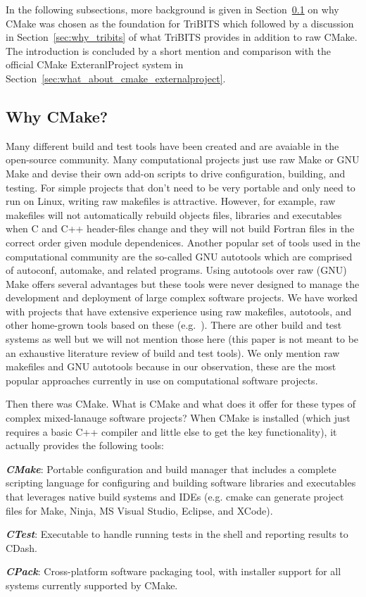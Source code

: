 \documentclass[note]{TechNote}
\begin{document}
In the following subsections, more background is given in Section~\ref{sec:why_cmake} on why CMake was chosen as the foundation for TriBITS which followed by a discussion in Section~\ref{sec:why_tribits} of what TriBITS provides in addition to raw CMake.  The introduction is concluded by a short mention and comparison with the official CMake ExteranlProject system in Section~\ref{sec:what_about_cmake_externalproject}.

%
\subsection{Why CMake?}
\label{sec:why_cmake}
%

Many different build and test tools have been created and are avaiable in the open-source community.  Many computational projects just use raw Make or GNU Make and devise their own add-on scripts to drive configuration, building, and testing.  For simple projects that don't need to be very portable and only need to run on Linux, writing raw makefiles is attractive.  However, for example, raw makefiles will not automatically rebuild objects files, libraries and executables when C and C++ header-files change and they will not build Fortran files in the correct order given module dependenices.  Another popular set of tools used in the computational community are the so-called GNU autotools which are comprised of autoconf, automake, and related programs.  Using autotools over raw (GNU) Make offers several advantages but these tools were never designed to manage the development and deployment of large complex software projects.  We have worked with projects that have extensive experience using raw makefiles, autotools, and other home-grown tools based on these (e.g.\ \cite{Trilinos}).  There are other build and test systems as well but we will not mention those here (this paper is not meant to be an exhaustive literature review of build and test tools).  We only mention raw makefiles and GNU autotools because in our observation, these are the most popular approaches currently in use on computational software projects.

Then there was CMake.  What is CMake and what does it offer for these types of complex mixed-lanauge software projects?  When CMake is installed (which just requires a basic C++ compiler and little else to get the key functionality), it actually provides the following tools:

\begin{compactitem}
\item\textit{\textbf{CMake}}: Portable configuration and build manager that includes a complete scripting language for configuring and building software libraries and executables that leverages native build systems and IDEs (e.g. cmake can generate project files for Make, Ninja, MS Visual Studio, Eclipse, and XCode).
\item\textit{\textbf{CTest}}: Executable to handle running tests in the shell and reporting results to CDash.
\item\textit{\textbf{CPack}}: Cross-platform software packaging tool, with installer support for all systems currently supported by CMake.
\end{compactitem}
\end{document}
